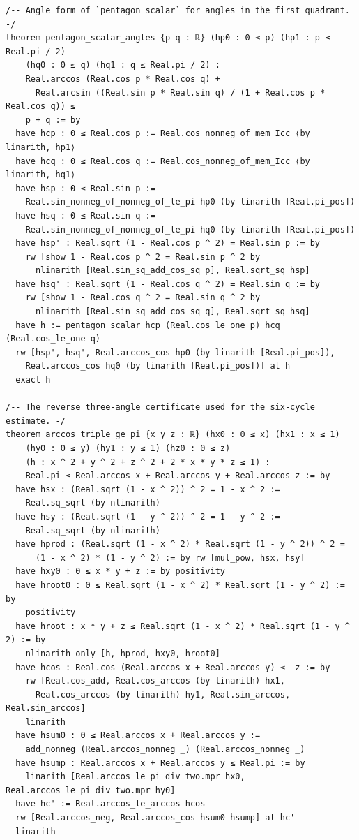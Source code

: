 \documentclass[11pt,a4paper]{article}
\begin{document}
\begin{Verbatim}[breaklines,breakanywhere,fontsize=\footnotesize]
/-- Angle form of `pentagon_scalar` for angles in the first quadrant. -/
theorem pentagon_scalar_angles {p q : ℝ} (hp0 : 0 ≤ p) (hp1 : p ≤ Real.pi / 2)
    (hq0 : 0 ≤ q) (hq1 : q ≤ Real.pi / 2) :
    Real.arccos (Real.cos p * Real.cos q) +
      Real.arcsin ((Real.sin p * Real.sin q) / (1 + Real.cos p * Real.cos q)) ≤
    p + q := by
  have hcp : 0 ≤ Real.cos p := Real.cos_nonneg_of_mem_Icc ⟨by linarith, hp1⟩
  have hcq : 0 ≤ Real.cos q := Real.cos_nonneg_of_mem_Icc ⟨by linarith, hq1⟩
  have hsp : 0 ≤ Real.sin p :=
    Real.sin_nonneg_of_nonneg_of_le_pi hp0 (by linarith [Real.pi_pos])
  have hsq : 0 ≤ Real.sin q :=
    Real.sin_nonneg_of_nonneg_of_le_pi hq0 (by linarith [Real.pi_pos])
  have hsp' : Real.sqrt (1 - Real.cos p ^ 2) = Real.sin p := by
    rw [show 1 - Real.cos p ^ 2 = Real.sin p ^ 2 by
      nlinarith [Real.sin_sq_add_cos_sq p], Real.sqrt_sq hsp]
  have hsq' : Real.sqrt (1 - Real.cos q ^ 2) = Real.sin q := by
    rw [show 1 - Real.cos q ^ 2 = Real.sin q ^ 2 by
      nlinarith [Real.sin_sq_add_cos_sq q], Real.sqrt_sq hsq]
  have h := pentagon_scalar hcp (Real.cos_le_one p) hcq (Real.cos_le_one q)
  rw [hsp', hsq', Real.arccos_cos hp0 (by linarith [Real.pi_pos]),
    Real.arccos_cos hq0 (by linarith [Real.pi_pos])] at h
  exact h

/-- The reverse three-angle certificate used for the six-cycle estimate. -/
theorem arccos_triple_ge_pi {x y z : ℝ} (hx0 : 0 ≤ x) (hx1 : x ≤ 1)
    (hy0 : 0 ≤ y) (hy1 : y ≤ 1) (hz0 : 0 ≤ z)
    (h : x ^ 2 + y ^ 2 + z ^ 2 + 2 * x * y * z ≤ 1) :
    Real.pi ≤ Real.arccos x + Real.arccos y + Real.arccos z := by
  have hsx : (Real.sqrt (1 - x ^ 2)) ^ 2 = 1 - x ^ 2 :=
    Real.sq_sqrt (by nlinarith)
  have hsy : (Real.sqrt (1 - y ^ 2)) ^ 2 = 1 - y ^ 2 :=
    Real.sq_sqrt (by nlinarith)
  have hprod : (Real.sqrt (1 - x ^ 2) * Real.sqrt (1 - y ^ 2)) ^ 2 =
      (1 - x ^ 2) * (1 - y ^ 2) := by rw [mul_pow, hsx, hsy]
  have hxy0 : 0 ≤ x * y + z := by positivity
  have hroot0 : 0 ≤ Real.sqrt (1 - x ^ 2) * Real.sqrt (1 - y ^ 2) := by
    positivity
  have hroot : x * y + z ≤ Real.sqrt (1 - x ^ 2) * Real.sqrt (1 - y ^ 2) := by
    nlinarith only [h, hprod, hxy0, hroot0]
  have hcos : Real.cos (Real.arccos x + Real.arccos y) ≤ -z := by
    rw [Real.cos_add, Real.cos_arccos (by linarith) hx1,
      Real.cos_arccos (by linarith) hy1, Real.sin_arccos, Real.sin_arccos]
    linarith
  have hsum0 : 0 ≤ Real.arccos x + Real.arccos y :=
    add_nonneg (Real.arccos_nonneg _) (Real.arccos_nonneg _)
  have hsump : Real.arccos x + Real.arccos y ≤ Real.pi := by
    linarith [Real.arccos_le_pi_div_two.mpr hx0, Real.arccos_le_pi_div_two.mpr hy0]
  have hc' := Real.arccos_le_arccos hcos
  rw [Real.arccos_neg, Real.arccos_cos hsum0 hsump] at hc'
  linarith


\end{Verbatim}
\end{document}

